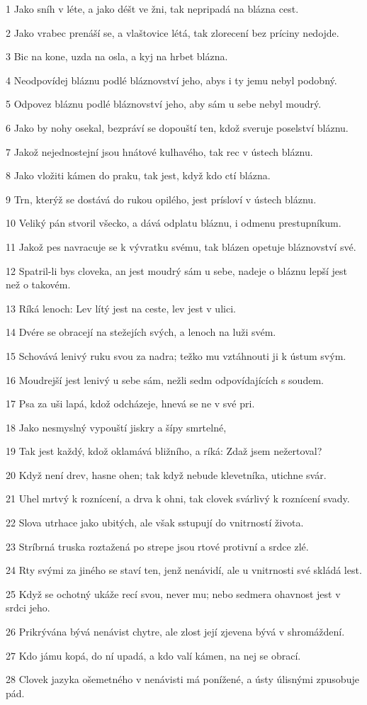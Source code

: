 \par 1 Jako sníh v léte, a jako déšt ve žni, tak nepripadá na blázna cest.
\par 2 Jako vrabec prenáší se, a vlaštovice létá, tak zlorecení bez príciny nedojde.
\par 3 Bic na kone, uzda na osla, a kyj na hrbet blázna.
\par 4 Neodpovídej bláznu podlé bláznovství jeho, abys i ty jemu nebyl podobný.
\par 5 Odpovez bláznu podlé bláznovství jeho, aby sám u sebe nebyl moudrý.
\par 6 Jako by nohy osekal, bezpráví se dopouští ten, kdož sveruje poselství bláznu.
\par 7 Jakož nejednostejní jsou hnátové kulhavého, tak rec v ústech bláznu.
\par 8 Jako vložiti kámen do praku, tak jest, když kdo ctí blázna.
\par 9 Trn, kterýž se dostává do rukou opilého, jest prísloví v ústech bláznu.
\par 10 Veliký pán stvoril všecko, a dává odplatu bláznu, i odmenu prestupníkum.
\par 11 Jakož pes navracuje se k vývratku svému, tak blázen opetuje bláznovství své.
\par 12 Spatril-li bys cloveka, an jest moudrý sám u sebe, nadeje o bláznu lepší jest než o takovém.
\par 13 Ríká lenoch: Lev lítý jest na ceste, lev jest v ulici.
\par 14 Dvére se obracejí na stežejích svých, a lenoch na luži svém.
\par 15 Schovává lenivý ruku svou za nadra; težko mu vztáhnouti ji k ústum svým.
\par 16 Moudrejší jest lenivý u sebe sám, nežli sedm odpovídajících s soudem.
\par 17 Psa za uši lapá, kdož odcházeje, hnevá se ne v své pri.
\par 18 Jako nesmyslný vypouští jiskry a šípy smrtelné,
\par 19 Tak jest každý, kdož oklamává bližního, a ríká: Zdaž jsem nežertoval?
\par 20 Když není drev, hasne ohen; tak když nebude klevetníka, utichne svár.
\par 21 Uhel mrtvý k roznícení, a drva k ohni, tak clovek svárlivý k roznícení svady.
\par 22 Slova utrhace jako ubitých, ale však sstupují do vnitrností života.
\par 23 Stríbrná truska roztažená po strepe jsou rtové protivní a srdce zlé.
\par 24 Rty svými za jiného se staví ten, jenž nenávidí, ale u vnitrnosti své skládá lest.
\par 25 Když se ochotný ukáže recí svou, never mu; nebo sedmera ohavnost jest v srdci jeho.
\par 26 Prikrývána bývá nenávist chytre, ale zlost její zjevena bývá v shromáždení.
\par 27 Kdo jámu kopá, do ní upadá, a kdo valí kámen, na nej se obrací.
\par 28 Clovek jazyka ošemetného v nenávisti má ponížené, a ústy úlisnými zpusobuje pád.

